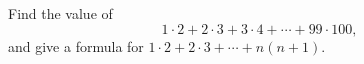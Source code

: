 Find the value of
\[
1\cdot2+2\cdot3+3\cdot4+\cdots+99\cdot100 ,
\]
and give a formula for $1\cdot2+2\cdot3+\cdots+n(n+1)$.
